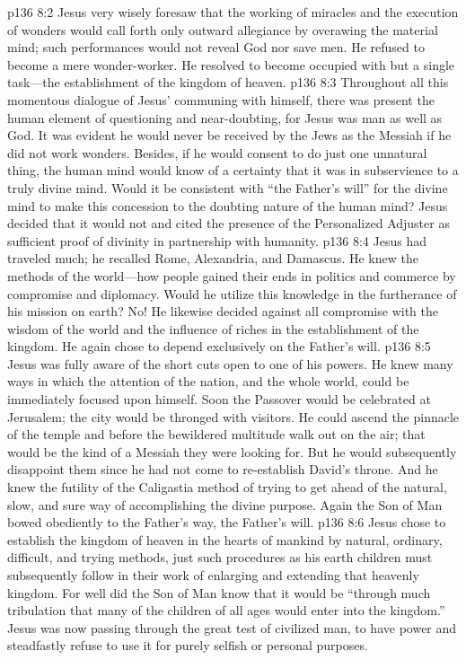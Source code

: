 \vs p136 8:2 Jesus very wisely foresaw that the working of miracles and the execution of wonders would call forth only outward allegiance by overawing the material mind; such performances would not reveal God nor save men. He refused to become a mere wonder\hyp{}worker. He resolved to become occupied with but a single task---the establishment of the kingdom of heaven.
\pc \vs p136 8:3 Throughout all this momentous dialogue of Jesus’ communing with himself, there was present the human element of questioning and near\hyp{}doubting, for Jesus was man as well as God. It was evident he would never be received by the Jews as the Messiah if he did not work wonders. Besides, if he would consent to do just one unnatural thing, the human mind would know of a certainty that it was in subservience to a truly divine mind. Would it be consistent with “the Father’s will” for the divine mind to make this concession to the doubting nature of the human mind? Jesus decided that it would not and cited the presence of the Personalized Adjuster as sufficient proof of divinity in partnership with humanity.
\pc \vs p136 8:4 Jesus had traveled much; he recalled Rome, Alexandria, and Damascus. He knew the methods of the world---how people gained their ends in politics and commerce by compromise and diplomacy. Would he utilize this knowledge in the furtherance of his mission on earth? No! He likewise decided against all compromise with the wisdom of the world and the influence of riches in the establishment of the kingdom. He again chose to depend exclusively on the Father’s will.
\vs p136 8:5 Jesus was fully aware of the short cuts open to one of his powers. He knew many ways in which the attention of the nation, and the whole world, could be immediately focused upon himself. Soon the Passover would be celebrated at Jerusalem; the city would be thronged with visitors. He could ascend the pinnacle of the temple and before the bewildered multitude walk out on the air; that would be the kind of a Messiah they were looking for. But he would subsequently disappoint them since he had not come to re\hyp{}establish David’s throne. And he knew the futility of the Caligastia method of trying to get ahead of the natural, slow, and sure way of accomplishing the divine purpose. Again the Son of Man bowed obediently to the Father’s way, the Father’s will.
\vs p136 8:6 Jesus chose to establish the kingdom of heaven in the hearts of mankind by natural, ordinary, difficult, and trying methods, just such procedures as his earth children must subsequently follow in their work of enlarging and extending that heavenly kingdom. For well did the Son of Man know that it would be “through much tribulation that many of the children of all ages would enter into the kingdom.” Jesus was now passing through the great test of civilized man, to have power and steadfastly refuse to use it for purely selfish or personal purposes.
